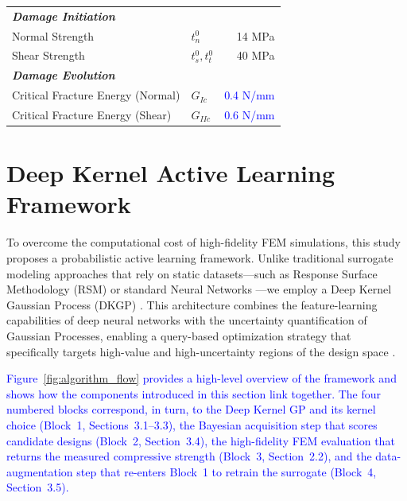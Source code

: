 \documentclass[
  preprint,
  12pt,
  a4paper
]{elsarticle}
\newcommand{\new}[1]{\textcolor{blue}{#1}}
\begin{document}
\begin{table}[htbp]
\begin{tabular}{l l r}
        \textit{\textbf{Damage Initiation}} & & \\
        Normal Strength & $t_n^0$ & 14 MPa \\
        Shear Strength & $t_s^0, t_t^0$ & 40 MPa \\
        
        \textit{\textbf{Damage Evolution}} & & \\
        Critical Fracture Energy (Normal) & $G_{Ic}$ & \new{0.4 N/mm} \\
        Critical Fracture Energy (Shear) & $G_{IIc}$ & \new{0.6 N/mm} \\
        \bottomrule
    \end{tabular}
\end{table}

\section{Deep Kernel Active Learning Framework}
\label{sec:AI_framework}

To overcome the computational cost of high-fidelity FEM simulations, this study proposes a probabilistic active learning framework. Unlike traditional surrogate modeling approaches that rely on static datasets—such as Response Surface Methodology (RSM) or standard Neural Networks \cite{queipo2005surrogate, luo2020surrogate}—we employ a Deep Kernel Gaussian Process (DKGP) \cite{wilson2016deep}. This architecture combines the feature-learning capabilities of deep neural networks with the uncertainty quantification of Gaussian Processes, enabling a query-based optimization strategy that specifically targets high-value and high-uncertainty regions of the design space \cite{ghosh2023digital}.

\new{Figure~\ref{fig:algorithm_flow} provides a high-level overview of the framework and shows how the components introduced in this section link together. The four numbered blocks correspond, in turn, to the Deep Kernel GP and its kernel choice (Block~1, Sections~3.1--3.3), the \new{Bayesian acquisition step that scores} candidate designs (Block~2, Section~3.4), the high-fidelity FEM evaluation that returns the measured compressive strength (Block~3, Section~2.2), and the data-augmentation step that re-enters Block~1 to retrain the surrogate (Block~4, Section~3.5).}
\end{document}
